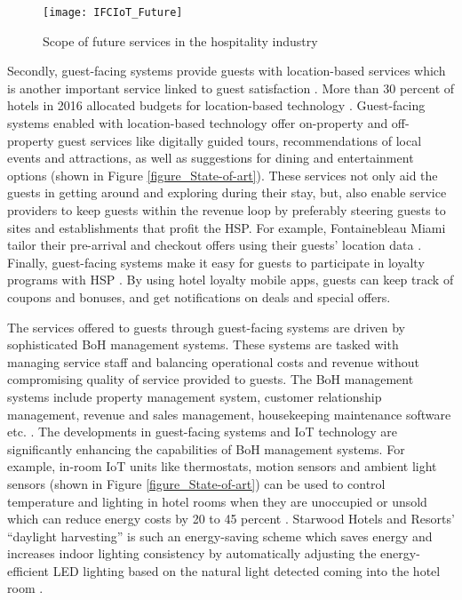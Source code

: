 \documentclass[10pt,journal,letterpaper]{IEEEtran}
\begin{document}
{\begin{figure*}[!t]
\centering
\texttt{[image: IFCIoT\_Future]}
\caption{Scope of future services in the hospitality industry}
\label{figure_IFCIoTFuture}
\end{figure*}

Secondly, guest-facing systems provide guests with location-based services which is another important service linked to guest satisfaction \cite{Tossell_DigitalGuestStrategy_2015}. More than 30 percent of hotels in 2016 allocated budgets for location-based technology \cite{DePinto_7TrendsIoTHospitality_2016}. Guest-facing systems enabled with location-based technology offer on-property and off-property guest services like digitally guided tours, recommendations of local events and attractions, as well as suggestions for dining and entertainment options (shown in Figure \ref{figure_State-of-art}). These services not only aid the guests in getting around and exploring during their stay, but, also enable service providers to keep guests within the revenue loop by preferably steering guests to sites and establishments that profit the HSP. For example, Fontainebleau Miami tailor their pre-arrival and checkout offers using their guests' location data \cite{DePinto_7TrendsIoTHospitality_2016}. Finally, guest-facing systems make it easy for guests to participate in loyalty programs with HSP \cite{Intelity_ForecastHotelTech_2016}. By using hotel loyalty mobile apps, guests can keep track of coupons and bonuses, and get notifications on deals and special offers.

The services offered to guests through guest-facing systems are driven by sophisticated BoH management systems. These systems are tasked with managing service staff and balancing operational costs and revenue without compromising quality of service provided to guests. The BoH management systems include property management system, customer relationship management, revenue and sales management, housekeeping maintenance software etc. \cite{Kasavana_HospitalityIndustry_2014}. The developments in guest-facing systems and IoT technology are significantly enhancing the capabilities of BoH management systems. For example, in-room IoT units like thermostats, motion sensors and ambient light sensors (shown in Figure \ref{figure_State-of-art}) can be used to control temperature and lighting in hotel rooms when they are unoccupied or unsold which can reduce energy costs by 20 to 45 percent \cite{DePinto_7TrendsIoTHospitality_2016}. Starwood Hotels and Resorts' ``daylight harvesting'' is such an energy-saving scheme which saves energy and increases indoor lighting consistency by automatically adjusting the energy-efficient LED lighting based on the natural light detected coming into the hotel room \cite{DePinto_7TrendsIoTHospitality_2016}.

}
\end{document}
